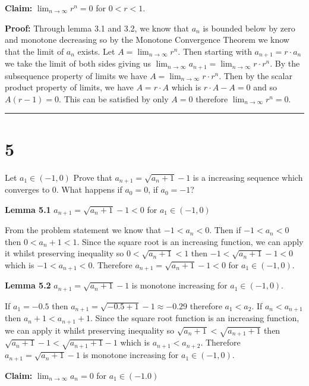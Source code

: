 \documentclass[10pt,letterpaper]{article}
\newcommand\ds{\displaystyle}
\newcommand\qedsym{\hfill \rule{2mm}{2mm}}
\begin{document}
\medskip

\textbf{Claim:} $\ds \lim_{n \to \infty} r^n= 0$ for $0 < r < 1$.

\medskip

\textbf{Proof:} Through lemma 3.1 and 3.2, we know that $a_n$ is bounded below by zero and monotone decreasing so by the Monotone Convergence Theorem we know that the limit of $a_n$ exists. Let $A = \ds \lim_{n \to \infty} r^n$. Then starting with $a_{n+1} = r\cdot a_n$ we take the limit of both sides giving us $\ds \lim_{n \to \infty} a_{n+1} = \ds \lim_{n\to\infty} r \cdot r^n$. By the subsequence property of limits we have $A = \ds \lim_{n\to\infty} r \cdot r^n$. Then by the scalar product property of limits, we have $A = r\cdot A$ which is $r\cdot A - A = 0$ and so $A (r - 1) = 0$. This can be satisfied by only $A = 0$ therefore $\ds \lim_{n \to \infty} r^n= 0$. \qedsym{

  \section*{5} Let $a_1 \in (-1, 0)$ Prove that $a_{n+1} = \sqrt{a_{n} +1} - 1$ is a increasing sequence which converges to 0. What happens if $a_0 = 0$, if $a_0 = -1$?

\medskip

\textbf{Lemma 5.1} $a_{n+1} = \sqrt{a_{n} +1} - 1 < 0$ for $a_1 \in (-1, 0)$

From the problem statement we know that $-1 < a_n < 0$. Then if $-1 < a_n < 0$ then $0 < a_n + 1 < 1$. Since the square root is an increasing function, we can apply it whilst preserving inequality so $0 < \sqrt{a_n + 1} < 1$ then $-1 < \sqrt{a_n + 1} - 1< 0$ which is $-1 < a_{n+1} < 0$. Therefore $a_{n+1} = \sqrt{a_{n} +1} - 1 < 0$ for $a_1 \in (-1, 0)$.

\medskip

\textbf{Lemma 5.2} $a_{n+1} = \sqrt{a_{n} +1} - 1$ is monotone increasing for $a_1 \in (-1, 0)$.

If $a_1 = -0.5$ then $a_{n+1} = \sqrt{-0.5 + 1} - 1 \approx -0.29$ therefore $a_1 < a_2$. If $a_n < a_{n+1}$ then $a_n + 1 < a_{n+1} + 1$. Since the square root function is an increasing function, we can apply it whilst preserving inequality so $\sqrt{a_n + 1} < \sqrt{a_{n+1} + 1}$ then $\sqrt{a_n + 1} - 1 < \sqrt{a_{n+1} + 1} - 1$ which is $a_{n+1} < a_{n+2}$. Therefore $a_{n+1} = \sqrt{a_{n} +1} - 1$ is monotone increasing for $a_1 \in (-1, 0)$.

\medskip

\textbf{Claim:} $\ds\lim_{n\to\infty} a_{n} = 0$ for $a_1 \in (-1. 0)$

}
\end{document}
